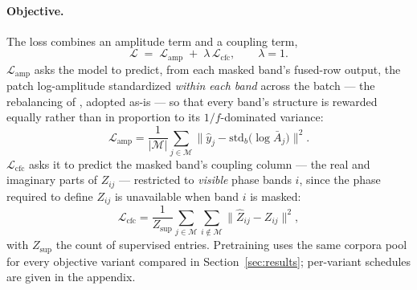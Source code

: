 \paragraph{Objective.} The loss combines an amplitude term and a coupling
term,
\begin{equation}
\mathcal{L} \;=\; \mathcal{L}_{\mathrm{amp}}
\;+\; \lambda\, \mathcal{L}_{\mathrm{cfc}},
\qquad \lambda = 1.
\label{eq:objective}
\end{equation}
$\mathcal{L}_{\mathrm{amp}}$ asks the model to predict, from each masked
band's fused-row output, the patch log-amplitude standardized \emph{within
each band} across the batch --- the rebalancing of
\citet{yu2026understanding}, adopted as-is --- so that every band's
structure is rewarded equally rather than in proportion to its
$1/f$-dominated variance:
\begin{equation}
\mathcal{L}_{\mathrm{amp}} = \frac{1}{|\mathcal{M}|}
\sum_{j \in \mathcal{M}}
\bigl\| \hat{y}_j - \mathrm{std}_b\!\bigl(\log \bar A_j\bigr) \bigr\|^2 .
\label{eq:lamp}
\end{equation}
$\mathcal{L}_{\mathrm{cfc}}$ asks it to predict the masked band's coupling
column --- the real and imaginary parts of $Z_{ij}$ --- restricted to
\emph{visible} phase bands $i$, since the phase required to define
$Z_{ij}$ is unavailable when band $i$ is masked:
\begin{equation}
\mathcal{L}_{\mathrm{cfc}} = \frac{1}{Z_{\mathrm{sup}}}
\sum_{j \in \mathcal{M}} \sum_{i \notin \mathcal{M}}
\bigl\| \hat{Z}_{ij} - Z_{ij} \bigr\|^2,
\label{eq:lcfc}
\end{equation}
with $Z_{\mathrm{sup}}$ the count of supervised entries. Pretraining uses
the same corpora pool for every objective variant compared in
Section~\ref{sec:results}; per-variant schedules are given in the appendix.
